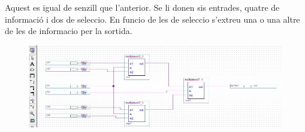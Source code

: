 \documentclass[12pt, a4papre]{article}
\begin{document}
	Aquest es igual de senzill que l'anterior. Se li donen sis entrades, quatre de informació i dos de seleccio. En funcio de les de seleccio s'extreu una  o una altre de les de informacio per la sortida.
	
		
		\begin{center}
	\begin{figure}[H]
		\begin{center}
		\includegraphics[width=150mm]{multiplexor4_1.jpeg}
		\end{center}
	\end{figure}
		\end{center}
\end{document}
